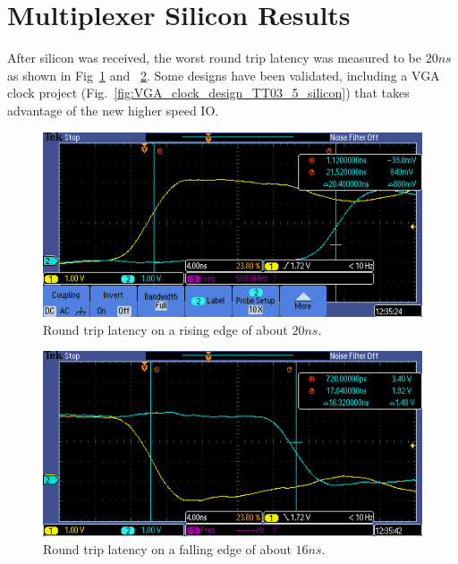 \section{Multiplexer Silicon Results}
\label{sec:multiplexer_silicon_res}
After silicon was received, the worst round trip latency was measured to be \(20 ns\) as shown in Fig~\ref{fig:round_trip_latency_rising_edge} and ~\ref{fig:round_trip_latency_falling_edge}. Some designs have been validated, including a VGA clock project (Fig.~\ref{fig:VGA_clock_design_TT03_5_silicon}) that takes advantage of the new higher speed IO.

\begin{figure}[htp]
\centering
\includegraphics[width=\columnwidth]{./Figs/tt3p5 rising latency.PNG}
\caption{Round trip latency on a rising edge of about \(20 ns\).}
\label{fig:round_trip_latency_rising_edge}
\end{figure}

\begin{figure}[htp]
\centering
\includegraphics[width=\columnwidth]{./Figs/tt3p5 falling latency.PNG}
\caption{Round trip latency on a falling edge of about \(16 ns\).}
\label{fig:round_trip_latency_falling_edge}
\end{figure}

